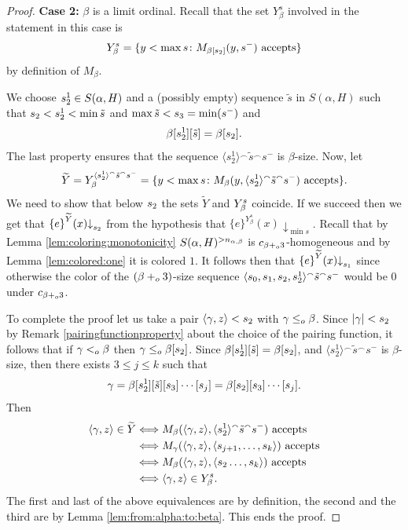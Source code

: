 \documentclass[11pt]{amsart}
\theoremstyle{definition}
\theoremstyle{remark}
\theoremstyle{plain}
\def\a{\alpha}
\def\b{\beta}
\def\g{\gamma}
\def\conc{{}^\smallfrown}
\newcommand{\set}[1]{{\{{#1}\}}}
\def\stops{{\downarrow}}
\newcommand{\leo}{<\sb{o}}
\newcommand{\leqo}{\leq\sb{o}}
\newcommand{\pluso}{+\sb{o}}
\def\stops{{\downarrow}}
\def\ifff{\Longleftrightarrow}
\newcommand{\lorenzo}[1]{\textcolor{blue}{#1}}
\newcommand{\andrea}[1]{\textcolor{green}{#1}}
\begin{document}
\begin{proof}
\smallskip

\textbf{Case 2:} $\beta$ is a limit ordinal. 
Recall that the set $Y^s_\beta$ involved in the statement in this case is 
$$Y^s_\beta  = \{ y < \max s \colon M \sb{\beta[s_2]}(y, s^-) \mbox { accepts}\}$$
by definition of $M_\beta$. 

We choose $s\sp 1\sb 2\in S(\alpha,H)$ and a (possibly empty) sequence $\tilde{s}$ in $S(\alpha,H)$ such that $s\sb2<s\sp 1\sb 2 <\min \tilde{s}$ and $\max \tilde{s} <s\sb 3 =\min(s^-)$ and 
$$
\beta[s\sp 1\sb 2][\tilde{s}]=\beta[s\sb 2].
$$
The last property ensures that the sequence $\langle s^1_2\rangle\conc\tilde{s}\conc s^-$ is $\beta$-size. 
Now, let 
$$
\widetilde{Y} = {Y\sb\beta \sp {\langle s^1_2\rangle\conc\tilde{s}\conc s^-}}=\set{y<\max s\colon M\sb\beta(y,\langle s^1_2\rangle\conc\tilde{s}\conc s^-)\mbox{ accepts}}.
$$
We need to show that below $s\sb 2$ the sets $\widetilde{Y}$ and $Y\sb\beta\sp s$ coincide.
If we succeed then we get that $\set{e}\sp {\widetilde{Y}}(x)\stops\sb{s\sb 2}$ from the hypothesis that $\{e\}^{Y^s_\beta}(x) \stops_{\min s}$. 
Recall that by Lemma \ref{lem:coloring:monotonicity} $S(\alpha, H)\sp{>n_{\a, \b}}$ is $c_{\beta\pluso3}$-homogeneous and by Lemma \ref{lem:colored:one} it is colored $1$. 
It follows then that $\set{e}\sp {\widetilde{Y}}(x)\stops\sb{s\sb 1}$ since otherwise the color of the $(\beta\pluso3)$-size sequence $\langle s\sb0,s\sb1, s\sb 2,s\sp 1\sb 2\rangle\conc \tilde{s}\conc s\sp -$ would be $0$ under $c\sb{\beta \pluso 3}$. 

To complete the proof let us take a pair $\langle \gamma,z\rangle <s\sb 2$ with $\gamma\leqo\beta$.
Since $|\gamma|< s\sb 2$ by Remark \ref{pairingfunctionproperty} about the choice of the pairing function, it follows that if $\g \leo \b$ then $\gamma\leqo \beta[s\sb 2]$.
Since $\beta[s\sp 1\sb2][\tilde{s}]= \beta[s \sb 2]$, and $\langle s^1_2\rangle \conc \tilde{s}\conc s^{-}$ is $\beta$-size, then there exists $3\leq j\leq k$ such that 
$$
\gamma=\beta[s\sp 1\sb 2][\tilde{s}][s\sb 3]\cdots [s\sb j] = \beta[s_2][s_3] \cdots[s_j].
$$
Then
\begin{equation*}
\begin{split}
\langle \gamma,z\rangle\in \widetilde{Y} 
& \ifff M\sb{\beta}(\langle \gamma,z\rangle, \langle s\sp 1\sb 2\rangle\conc\tilde{s}\conc s\sp{-})\mbox{ accepts}\\
& \ifff M\sb{\gamma}(\langle \gamma,z\rangle, \langle s\sb {j+1},\dots,s\sb k\rangle)\mbox{ accepts}\\
& \ifff  M\sb{\beta}(\langle \gamma,z\rangle,\langle s\sb 2\dots,s\sb k\rangle)\mbox{ accepts}\\
&\ifff \langle \gamma,z\rangle\in {Y\sp s\sb\beta}.
\end{split}
\end{equation*}
The first and last of the above equivalences are by definition, the second and the third are by Lemma \ref{lem:from:alpha:to:beta}.
This ends the proof.
\end{proof}
\end{document}
